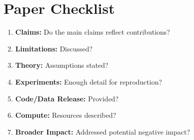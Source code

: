 \section*{Paper Checklist}
\label{sec:checklist}

\begin{enumerate}
  \item \textbf{Claims:} Do the main claims reflect contributions? \answerTODO{}
  \item \textbf{Limitations:} Discussed? \answerTODO{}
  \item \textbf{Theory:} Assumptions stated? \answerTODO{}
  \item \textbf{Experiments:} Enough detail for reproduction? \answerTODO{}
  \item \textbf{Code/Data Release:} Provided? \answerTODO{}
  \item \textbf{Compute:} Resources described? \answerTODO{}
  \item \textbf{Broader Impact:} Addressed potential negative impact? \answerTODO{}
\end{enumerate}
